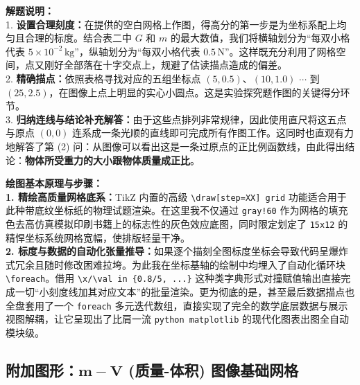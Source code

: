 \vspace{0.6cm}

{\small\color{gray}
\textbf{解题说明：}\\
1. \textbf{设置合理刻度：}在提供的空白网格上作图，得高分的第一步是为坐标系配上均匀且合理的标度。结合表二中 $G$ 和 $m$ 的最大数值，我们将横轴划分为“每双小格代表 $5\times 10^{-2}\,\text{kg}$”，纵轴划分为“每双小格代表 $0.5\,\text{N}$”。这样既充分利用了网格空间，点又刚好全部落在十字交点上，规避了估读描点造成的偏差。\\
2. \textbf{精确描点：}依照表格寻找对应的五组坐标点 $(5, 0.5)、(10, 1.0)$ $\cdots$ 到 $(25, 2.5)$，在图像上点上明显的实心小圆点。这是实验探究题作图的关键得分环节。\\
3. \textbf{归纳连线与结论补充解答：}由于这些点排列非常规律，因此使用直尺将这五点与原点 $(0,0)$ 连系成一条光顺的直线即可完成所有作图工作。这同时也直观有力地解答了第 (2) 问：从图像可以看出这是一条过原点的正比例函数线，由此得出结论：\textbf{物体所受重力的大小跟物体质量成正比}。
}

\vspace{0.6cm}

{\small\color{blue!70!black}
\textbf{绘图基本原理与步骤：}\\
\textbf{1. 精绘高质量网格底系：}TikZ 内置的高级 \texttt{\textbackslash draw[step=XX] grid} 功能适合用于此种带底纹坐标纸的物理试题渲染。在这里我不仅通过 \texttt{gray!60} 作为网格的填充色去高仿真模拟印刷书籍上的标志性的灰色效应底图，同时限定划定了 \texttt{15x12} 的精悍坐标系统网格宽幅，使排版轻量干净。\\
\textbf{2. 标度与数据的自动化张量推导：}如果逐个描刻全图标度坐标会导致代码呈爆炸式冗余且随时修改困难拉垮。为此我在坐标基轴的绘制中均埋入了自动化循环块 \texttt{\textbackslash foreach}。借用 \texttt{\textbackslash x/\textbackslash val in \{0.8/5, ...\}} 这种类字典形式对撞赋值输出直接完成一切“小刻度线加其对应文本”的批量渲染。更为彻底的是，甚至最后数据描点也全盘套用了一个 \texttt{foreach} 多元迭代数组，直接实现了完全的数学底层数据与展示视图解耦，让它呈现出了比肩一流 \texttt{python matplotlib} 的现代化图表出图全自动模块级。
}


\newpage

\subsection{附加图形：$\boldsymbol{m-V}$ (质量-体积) 图像基础网格}

